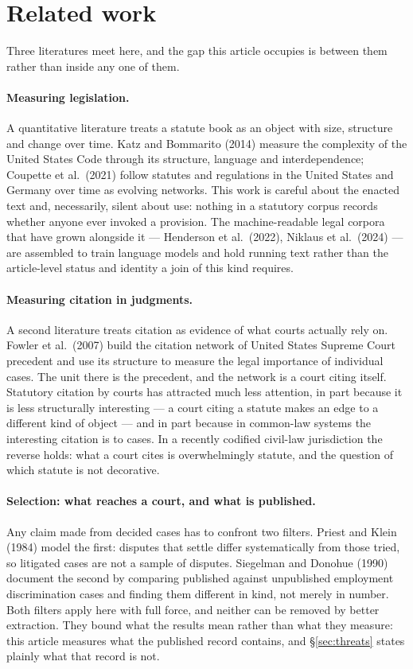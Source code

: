 \documentclass[11pt]{article}
\begin{document}
\section{Related work}
\label{sec:related}

Three literatures meet here, and the gap this article occupies is between
them rather than inside any one of them.

\paragraph{Measuring legislation.} A quantitative literature treats a statute
book as an object with size, structure and change over time. Katz and
Bommarito (2014) measure the complexity of the United States Code through its
structure, language and interdependence; Coupette et al.\ (2021) follow
statutes and regulations in the United States and Germany over time as
evolving networks. This work is careful about the enacted text and,
necessarily, silent about use: nothing in a statutory corpus records whether
anyone ever invoked a provision. The machine-readable legal corpora that have
grown alongside it --- Henderson et al.\ (2022), Niklaus et al.\ (2024) ---
are assembled to train language models and hold running text rather than the
article-level status and identity a join of this kind requires.

\paragraph{Measuring citation in judgments.} A second literature treats
citation as evidence of what courts actually rely on. Fowler et al.\ (2007)
build the citation network of United States Supreme Court precedent and use
its structure to measure the legal importance of individual cases. The unit
there is the precedent, and the network is a court citing itself. Statutory
citation by courts has attracted much less attention, in part because it is
less structurally interesting --- a court citing a statute makes an
edge to a different kind of object --- and in part because in common-law
systems the interesting citation is to cases. In a recently codified civil-law
jurisdiction the reverse holds: what a court cites is overwhelmingly statute,
and the question of which statute is not decorative.

\paragraph{Selection: what reaches a court, and what is published.} Any claim
made from decided cases has to confront two filters. Priest and Klein (1984)
model the first: disputes that settle differ systematically from those tried,
so litigated cases are not a sample of disputes. Siegelman and Donohue (1990)
document the second by comparing published against unpublished employment
discrimination cases and finding them different in kind, not merely in
number. Both filters apply here with full force, and neither can be removed
by better extraction. They bound what the results mean rather than what they
measure: this article measures what the published record contains, and
§\ref{sec:threats} states plainly what that record is not.
\end{document}
